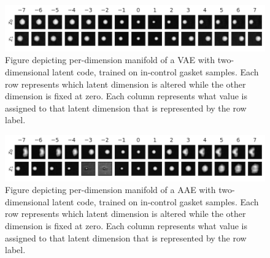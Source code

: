 \documentclass{scrartcl}
\theoremstyle{definition}
\begin{document}
\begin{figure}[!t]
    
    \includegraphics[width=0.9\linewidth]{figs/manifold_vae.pdf}
    \caption{Figure depicting per-dimension manifold of a VAE with two-dimensional latent code, trained on in-control gasket samples. Each row represents which latent dimension is altered while the other dimension is fixed at zero. Each column represents what value is assigned to that latent dimension that is represented by the row label.}
    \label{fig:manifold_vae}
\end{figure}


\begin{figure}[!t]
    
    \includegraphics[width=0.9\linewidth]{figs/manifold_aae.pdf}
    \caption{Figure depicting per-dimension manifold of a AAE with two-dimensional latent code, trained on in-control gasket samples. Each row represents which latent dimension is altered while the other dimension is fixed at zero. Each column represents what value is assigned to that latent dimension that is represented by the row label.}
    \label{fig:manifold_aae}
\end{figure}
\end{document}

